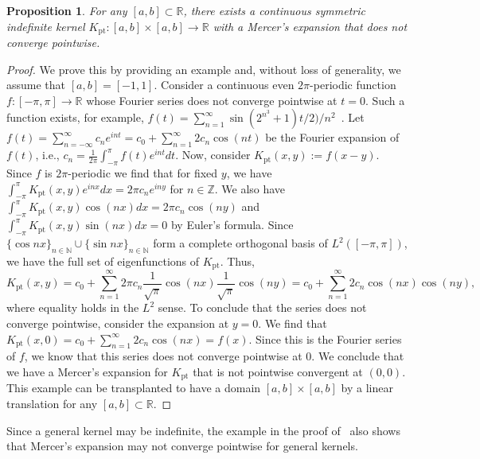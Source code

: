 \documentclass{article}
\newtheorem{proposition}{Proposition}
\begin{document}
\begin{proposition}\label{prop:contcounterex}
For any $[a,b]\subset\mathbb{R}$, there exists a continuous symmetric indefinite kernel $K_{\text{pt}}:[a, b]\times [a, b]\rightarrow \mathbb{R}$ with a Mercer's expansion that does not converge pointwise. 
\end{proposition}
\begin{proof}
    We prove this by providing an example and, without loss of generality, we assume that $[a,b]=[-1,1]$. Consider a continuous even $2\pi$-periodic function $f:[-\pi,\pi]\rightarrow\mathbb{R}$ whose Fourier series does not converge pointwise at $t=0$. Such a function exists, for example, $f(t) = \sum_{n=1}^\infty \sin(2^{n^3}+1)t/2)/n^2$~\citep{fejer1911singularites}. Let $f(t) = \sum_{n=-\infty}^\infty c_n e^{int} = c_0 + \sum_{n=1}^\infty 2c_n \cos(nt)$ be the Fourier expansion of $f(t)$, i.e., $c_n = \frac{1}{2\pi}\int_{-\pi}^\pi f(t) e^{int}dt$. %
    Now, consider $K_{\text{pt}}(x, y) := f(x-y)$. Since $f$ is $2\pi$-periodic we find that for fixed $y$, we have $\int_{-\pi}^\pi K_{\text{pt}}(x, y) e^{inx}dx = 2\pi c_n e^{iny}$ for $n\in\mathbb{Z}$. We also have $\int_{-\pi}^\pi K_{\text{pt}}(x, y)\cos(nx) dx = 2\pi c_n\cos(ny)$ and $\int_{-\pi}^\pi K_{\text{pt}}(x, y)\sin(nx)dx = 0$ by Euler's formula. Since $\{\cos{nx}\}_{n\in\mathbb{N}}\cup\{\sin{nx}\}_{n\in\mathbb{N}}$ form a complete orthogonal basis of $L^2([-\pi,\pi])$, we have the full set of eigenfunctions of $K_{\text{pt}}$. Thus, 
    \begin{equation*}
        K_{\text{pt}}(x, y) = c_0 + \sum_{n=1}^\infty 2\pi c_n \frac{1}{\sqrt\pi}\cos (nx) \frac{1}{\sqrt\pi}\cos(ny) = c_0 + \sum_{n=1}^\infty 2 c_n \cos(nx)\cos(ny),
    \end{equation*}
    where equality holds in the $L^2$ sense. To conclude that the series does not converge pointwise, consider the expansion at $y=0$. We find that $K_{\text{pt}}(x, 0) = c_0 + \sum_{n=1}^\infty 2c_n \cos(nx) = f(x)$. Since this is the Fourier series of $f$, we know that this series does not converge pointwise at $0$. We conclude that we have a Mercer's expansion for $K_{\text{pt}}$ that is not pointwise convergent at $(0,0)$. This example can be transplanted to have a domain $[a,b]\times [a,b]$ by a linear translation for any $[a,b]\subset\mathbb{R}$. 
\end{proof}

Since a general kernel may be indefinite, the example in the proof of~ also shows that Mercer's expansion may not converge pointwise for general kernels. 
\end{document}
